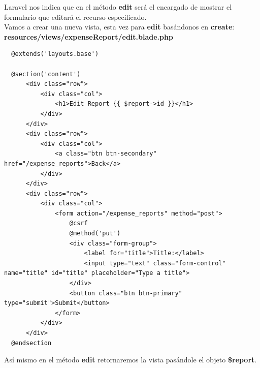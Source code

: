 \documentclass{article}
\begin{document}
Laravel nos indica que en el método \textbf{edit} será el encargado de mostrar
el formulario que editará el recurso especificado.\\

Vamos a crear una nueva vista, esta vez para \textbf{edit} basándonos en
\textbf{create}:\\

\textbf{resources/views/expenseReport/edit.blade.php}
\begin{verbatim}
  @extends('layouts.base')

  @section('content')
      <div class="row">
          <div class="col">
              <h1>Edit Report {{ $report->id }}</h1>
          </div>
      </div>
      <div class="row">
          <div class="col">
              <a class="btn btn-secondary" href="/expense_reports">Back</a>
          </div>
      </div>
      <div class="row">
          <div class="col">
              <form action="/expense_reports" method="post">
                  @csrf
                  @method('put')
                  <div class="form-group">
                      <label for="title">Title:</label>
                      <input type="text" class="form-control" name="title" id="title" placeholder="Type a title">
                  </div>
                  <button class="btn btn-primary" type="submit">Submit</button>
              </form>
          </div>
      </div>
  @endsection
\end{verbatim}

Así mismo en el método \textbf{edit} retornaremos la vista pasándole el objeto
\textbf{\$report}.\\
\end{document}
